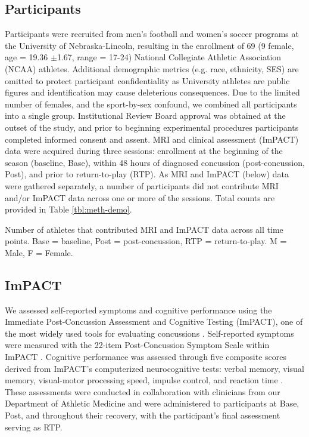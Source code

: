 \documentclass[12pt]{article}
\begin{document}
\subsection{Participants}
\label{ssec:meth-part}
Participants were recruited from men's football and women's soccer programs at the University of Nebraska-Lincoln, resulting in the enrollment of 69 (9 female, age = 19.36 $\pm$1.67, range = 17-24) National Collegiate Athletic Association (NCAA) athletes. Additional demographic metrics (e.g. race, ethnicity, SES) are omitted to protect participant confidentiality as University athletes are public figures and identification may cause deleterious consequences. Due to the limited number of females, and the sport-by-sex confound, we combined all participants into a single group. Institutional Review Board approval was obtained at the outset of the study, and prior to beginning experimental procedures participants completed informed consent and assent. MRI and clinical assessment (ImPACT) data were acquired during three sessions: enrollment at the beginning of the season (baseline, Base), within 48 hours of diagnosed concussion (post-concussion, Post), and prior to return-to-play (RTP). As MRI and ImPACT (below) data were gathered separately, a number of participants did not contribute MRI and/or ImPACT data across one or more of the sessions. Total counts are provided in Table \ref{tbl:meth-demo}.

\begin{table}[H]
	\scriptsize
	
	\caption{Number of athletes that contributed MRI and ImPACT data across all time points. Base = baseline, Post = post-concussion, RTP = return-to-play. M = Male, F = Female.}
	\label{tbl:meth-demo}
\end{table}


\subsection{ImPACT}
\label{ssec:meth-imp}
We assessed self-reported symptoms and cognitive performance using the Immediate Post-Concussion Assessment and Cognitive Testing (ImPACT), one of the most widely used tools for evaluating concussions \parencite{lovell2005ImPACT200540,dessy2017ReviewAssessmentScales}. Self-reported symptoms were measured with the 22-item Post-Concussion Symptom Scale within ImPACT \parencite{lovell2006MeasurementSymptomsFollowing}. Cognitive performance was assessed through five composite scores derived from ImPACT's computerized neurocognitive tests: verbal memory, visual memory, visual-motor processing speed, impulse control, and reaction time \parencite{lovell2005ImPACT200540}. These assessments were conducted in collaboration with clinicians from our Department of Athletic Medicine and were administered to participants at Base, Post, and throughout their recovery, with the participant's final assessment serving as RTP.
\end{document}
